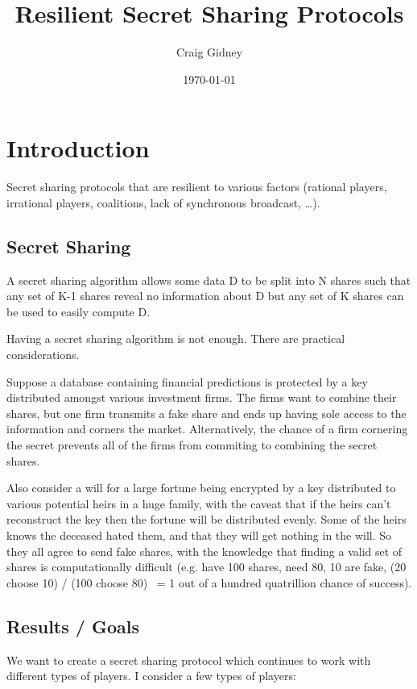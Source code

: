 \documentclass{article}
\title{Resilient Secret Sharing Protocols}
\author{Craig Gidney}
\date{\today}
\begin{document}
\maketitle

\section{Introduction}

Secret sharing protocols that are resilient to various factors (rational players, irrational players, coalitions, lack of synchronous broadcast, \ldots).

\subsection{Secret Sharing}

A secret sharing algorithm allows some data D to be split into N shares such that any set of K-1 shares reveal no information about D but any set of K shares can be used to easily compute D.

Having a secret sharing algorithm is not enough. There are practical considerations.

Suppose a database containing financial predictions is protected by a key distributed amongst various investment firms. The firms want to combine their shares, but one firm transmits a fake share and ends up having sole access to the information and corners the market. Alternatively, the chance of a firm cornering the secret prevents all of the firms from commiting to combining the secret shares.

Also consider a will for a large fortune being encrypted by a key distributed to various potential heirs in a huge family, with the caveat that if the heirs can't reconstruct the key then the fortune will be distributed evenly. Some of the heirs knows the deceased hated them, and that they will get nothing in the will. So they all agree to send fake shares, with the knowledge that finding a valid set of shares is computationally difficult (e.g. have 100 shares, need 80, 10 are fake, (20 choose 10) / (100 choose 80) ~= 1 out of a hundred quatrillion chance of success).

\subsection{Results / Goals}

We want to create a secret sharing protocol which continues to work with different types of players. I consider a few types of players:
\end{document}
